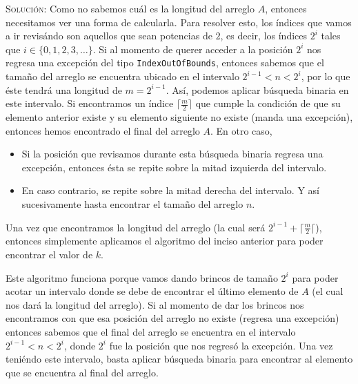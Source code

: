 \documentclass[letterpaper,11pt]{article}
\begin{document}
\begin{enumerate}
\begin{enumerate}
        \textsc{Solución:} Como no sabemos cuál es la longitud del arreglo $A$, 
        entonces necesitamos ver una forma de calcularla. Para resolver esto, 
        los índices que vamos a ir revisándo son aquellos que sean potencias 
        de $2$, es decir, los índices $2^i$ tales que $i \in 
        \{0, 1, 2, 3, \ldots\}$. Si al momento de querer acceder a la posición 
        $2^i$ nos regresa una excepción del tipo \texttt{IndexOutOfBounds}, 
        entonces sabemos que el tamaño del arreglo se encuentra ubicado en el 
        intervalo $2^{i-1} < n < 2^{i}$, por lo que éste tendrá una longitud 
        de $m =2^{i-1}$. Así, podemos aplicar búsqueda binaria en este intervalo.
        Si encontramos un índice $\lceil \frac{m}{2} \rceil$ que cumple la 
        condición de que su elemento anterior existe y su elemento siguiente no 
        existe (manda una excepción), entonces hemos encontrado el final del 
        arreglo $A$. En otro caso, 
        \begin{itemize}
            \item Si la posición que revisamos durante esta búsqueda binaria 
            regresa una excepción, entonces ésta se repite sobre la mitad 
            izquierda del intervalo.

            \item En caso contrario, se repite sobre la mitad derecha del 
            intervalo. Y así sucesivamente hasta encontrar el tamaño del 
            arreglo $n$.
        \end{itemize}

        Una vez que encontramos la longitud del arreglo (la cual será 
        $2^{i-1} + \lceil \frac{m}{2} \lceil$), entonces simplemente 
        aplicamos el algoritmo del inciso anterior para poder encontrar 
        el valor de $k$.

        Este algoritmo funciona porque vamos dando brincos de tamaño $2^i$ 
        para poder acotar un intervalo donde se debe de encontrar el último 
        elemento de $A$ (el cual nos dará la longitud del arreglo). Si al 
        momento de dar los brincos nos encontramos con que esa posición del 
        arreglo no existe (regresa una excepción) entonces sabemos que el 
        final del arreglo se encuentra en el intervalo $2^{i-1} < n < 2^i$, 
        donde $2^i$ fue la posición que nos regresó la excepción. Una vez 
        teniéndo este intervalo, basta aplicar búsqueda binaria para encontrar 
        al elemento que se encuentra al final del arreglo. 


\end{enumerate}
\end{enumerate}
\end{document}

